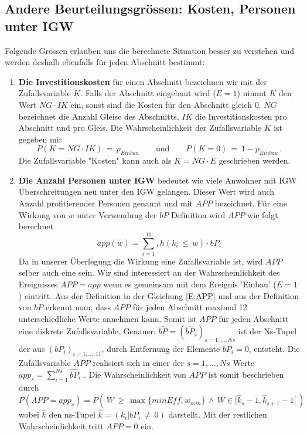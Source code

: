 \subsection{Andere Beurteilungsgrössen: Kosten, Personen unter IGW} %
Folgende Grössen erlauben uns die berechnete Situation besser zu verstehen und werden deshalb ebenfalls für jeden Abschnitt bestimmt:
\begin{enumerate}
	\item \textbf{Die Investitionskosten} für einen Abschnitt bezeichnen wir mit der Zufallsvariable $K$. Falls der Abschnitt eingebaut wird ($E=1$) nimmt $K$ den Wert $NG\cdot IK$ ein, sonst sind die Kosten für den Abschnitt gleich 0.  $NG$ bezeichnet die Anzahl Gleise des Abschnitts, $IK$ die Investitionskosten pro Abschnitt und pro Gleis. Die Wahrscheinlichkeit der Zufallsvariable $K$ ist gegeben mit 
	\begin{equation}
		P(K=NG\cdot IK)\, =\, p_{Einbau}\qquad \mathrm{und} \qquad P(K=0)\, =\, 1- p_{Einbau}\,.
	\end{equation}
	Die Zufallsvariable "Kosten" kann auch als $K= NG\cdot E$ geschrieben werden.
	\item \textbf{Die Anzahl Personen unter IGW } bedeutet wie viele Anwohner mit IGW Überschreitungen neu unter den IGW gelangen. Dieser Wert wird auch Anzahl profitierender Personen genannt und mit $APP$ bezeichnet.
	Für eine Wirkung von $w$ unter Verwendung der $bP$ Definition wird $APP$ wie folgt berechnet 
	\begin{equation}\label{E:APP}
		app(w) = \sum_{i=1}^11, h(k_i\,\leq\,w)\cdot bP_i
	\end{equation}
	Da in unserer Überlegung die Wirkung eine Zufallsvariable ist, wird $APP$ selber auch eine sein. Wir sind interessiert an der Wahrscheinlichkeit des Ereignisses $APP=app$ wenn es gemeinsam mit dem Ereignis 'Einbau' ($E=1$) eintritt. Aus der Definition in der Gleichung \ref{E:APP} und aus der Definition von $bP$ erkennt man, dass $APP$ für jeden Abschnitt maximal 12 unterschiedliche Werte annehmen kann. Somit ist $APP$ für jeden Abschnitt eine diskrete Zufallsvariable. Genauer: $\widehat{bP} = (\widehat{bP}_s)_{s=1,...,Ns}$  ist der Ns-Tupel der aus $(bP_i)_{i=1,...,11}$,  durch Entfernung der  Elemente $bP_i=0$, entsteht. Die Zufallsvariable $APP$ realisiert sich in einer der $s=1,...,Ns$ Werte $app_s = \sum_{i=1}^{Ns} \widehat{bP}_i $ . Die  Wahrscheinlichkeit  von $APP$ ist somit beschrieben durch
	\begin{equation*}
		P(APP=app_s) = P\left(\,W\,\geq \,\max\{minEff,w_{min}\}\, \wedge \, W\in[\hat{k}_s-1,\hat{k}_{s+1}-1[\, \right)
	\end{equation*}
	wobei $\hat{k}$ den ns-Tupel $\hat{k} = (k_i | bP_i\, \neq\, 0 )$ darstellt. Mit der restlichen Wahrscheinlichkeit tritt $APP=0$ ein.
\end{enumerate}
